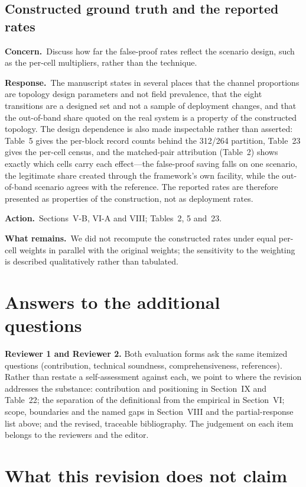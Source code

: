 \documentclass[10pt,letterpaper]{article}
\newcommand{\Concern}[1]{\par\smallskip\noindent\textbf{Concern.}\ #1\par}
\newcommand{\Response}[1]{\par\smallskip\noindent\textbf{Response.}\ #1\par}
\newcommand{\Action}[1]{\par\smallskip\noindent\textbf{Action.}\ #1\par}
\newcommand{\Remains}[1]{\par\smallskip\noindent\textbf{What remains.}\ #1\par}
\begin{document}
\subsection{Constructed ground truth and the reported rates}
\Concern{Discuss how far the false-proof rates reflect the scenario design, such
as the per-cell multipliers, rather than the technique.}
\Response{The manuscript states in several places that the channel proportions
are topology design parameters and not field prevalence, that the eight
transitions are a designed set and not a sample of deployment changes, and that
the out-of-band share quoted on the real system is a property of the constructed
topology. The design dependence is also made inspectable rather than asserted:
Table~5 gives the per-block record counts behind the 312/264 partition, Table~23
gives the per-cell census, and the matched-pair attribution (Table~2) shows
exactly which cells carry each effect---the false-proof saving falls on one
scenario, the legitimate share created through the framework's own facility,
while the out-of-band scenario agrees with the reference. The reported rates are
therefore presented as properties of the construction, not as deployment
rates.}
\Action{Sections~V-B, VI-A and VIII; Tables~2, 5 and~23.}
\Remains{We did not recompute the constructed rates under equal per-cell
weights in parallel with the original weights; the sensitivity to the weighting
is described qualitatively rather than tabulated.}

\section{Answers to the additional questions}
\label{sec:addq}

\noindent\textbf{Reviewer 1 and Reviewer 2.} Both evaluation forms ask the same
itemized questions (contribution, technical soundness, comprehensiveness,
references). Rather than restate a self-assessment against each, we point to
where the revision addresses the substance: contribution and positioning in
Section~IX and Table~22; the separation of the definitional from the empirical
in Section~VI; scope, boundaries and the named gaps in Section~VIII and the
partial-response list above; and the revised, traceable bibliography. The
judgement on each item belongs to the reviewers and the editor.

\section{What this revision does not claim}
\label{sec:partial}
\end{document}
